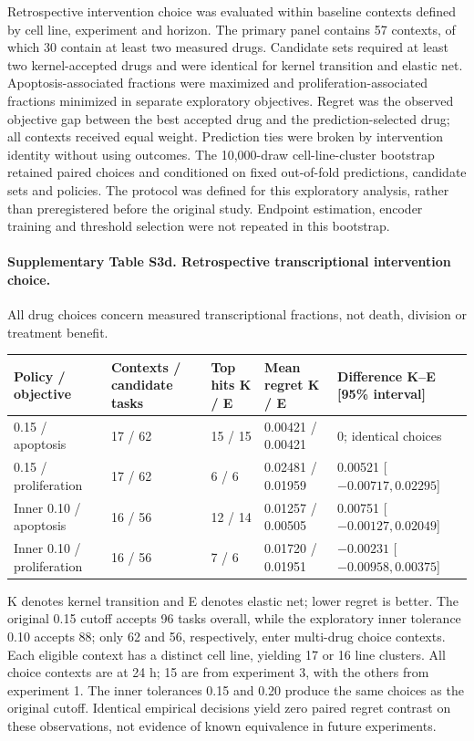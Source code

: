 \documentclass[a4paper,fleqn]{cas-sc}
\makeatletter
\DeclareRobustCommand{\rev}[1]{{\color{red}\def\@citecolor{black}\def\@linkcolor{red}\def\@urlcolor{red}#1}}
\makeatother
\begin{document}
\clearpage
\rev{Retrospective intervention choice was evaluated within baseline contexts defined by cell line, experiment and horizon.} \rev{The primary panel contains 57 contexts, of which 30 contain at least two measured drugs.} \rev{Candidate sets required at least two kernel-accepted drugs and were identical for kernel transition and elastic net.} \rev{Apoptosis-associated fractions were maximized and proliferation-associated fractions minimized in separate exploratory objectives.} \rev{Regret was the observed objective gap between the best accepted drug and the prediction-selected drug; all contexts received equal weight.} \rev{Prediction ties were broken by intervention identity without using outcomes.} \rev{The 10,000-draw cell-line-cluster bootstrap retained paired choices and conditioned on fixed out-of-fold predictions, candidate sets and policies.} \rev{The protocol was defined for this exploratory analysis, rather than preregistered before the original study.} \rev{Endpoint estimation, encoder training and threshold selection were not repeated in this bootstrap.}

\rev{\paragraph{Supplementary Table S3d. Retrospective transcriptional intervention choice.}}
\rev{All drug choices concern measured transcriptional fractions, not death, division or treatment benefit.}
\begin{longtable}{p{}p{}p{}p{}p{}}
\toprule
\rev{Policy / objective} & \rev{Contexts / candidate tasks} & \rev{Top hits K / E} & \rev{Mean regret K / E} & \rev{Difference K--E [95\% interval]}\\
\midrule
\endhead
\rev{0.15 / apoptosis} & \rev{17 / 62} & \rev{15 / 15} & \rev{0.00421 / 0.00421} & \rev{0; identical choices}\\
\rev{0.15 / proliferation} & \rev{17 / 62} & \rev{6 / 6} & \rev{0.02481 / 0.01959} & \rev{0.00521 [$-0.00717,0.02295$]}\\
\rev{Inner 0.10 / apoptosis} & \rev{16 / 56} & \rev{12 / 14} & \rev{0.01257 / 0.00505} & \rev{0.00751 [$-0.00127,0.02049$]}\\
\rev{Inner 0.10 / proliferation} & \rev{16 / 56} & \rev{7 / 6} & \rev{0.01720 / 0.01951} & \rev{$-0.00231$ [$-0.00958,0.00375$]}\\
\bottomrule
\end{longtable}
\rev{K denotes kernel transition and E denotes elastic net; lower regret is better.} \rev{The original 0.15 cutoff accepts 96 tasks overall, while the exploratory inner tolerance 0.10 accepts 88; only 62 and 56, respectively, enter multi-drug choice contexts.} \rev{Each eligible context has a distinct cell line, yielding 17 or 16 line clusters.} \rev{All choice contexts are at 24 h; 15 are from experiment 3, with the others from experiment 1.} \rev{The inner tolerances 0.15 and 0.20 produce the same choices as the original cutoff.} \rev{Identical empirical decisions yield zero paired regret contrast on these observations, not evidence of known equivalence in future experiments.}
\end{document}
